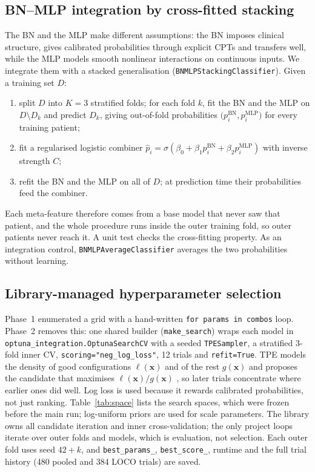 \documentclass[conference]{IEEEtran}
\newcommand{\code}[1]{\texttt{\small #1}}
\begin{document}
\subsection{BN--MLP integration by cross-fitted stacking}
The BN and the MLP make different assumptions: the BN imposes clinical structure, gives calibrated probabilities through explicit CPTs and transfers well, while the MLP models smooth nonlinear interactions on continuous inputs. We integrate them with a stacked generalisation \cite{wolpert,superlearner} (\code{BNMLPStackingClassifier}). Given a training set $D$:
\begin{enumerate}
\item split $D$ into $K=3$ stratified folds; for each fold $k$, fit the BN and the MLP on $D\setminus D_k$ and predict $D_k$, giving out-of-fold probabilities $\big(p^{\text{BN}}_i, p^{\text{MLP}}_i\big)$ for every training patient;
\item fit a regularised logistic combiner $\hat p_i = \sigma(\beta_0 + \beta_1 p^{\text{BN}}_i + \beta_2 p^{\text{MLP}}_i)$ with inverse strength $C$;
\item refit the BN and the MLP on all of $D$; at prediction time their probabilities feed the combiner.
\end{enumerate}
Each meta-feature therefore comes from a base model that never saw that patient, and the whole procedure runs inside the outer training fold, so outer patients never reach it. A unit test checks the cross-fitting property. As an integration control, \code{BNMLPAverageClassifier} averages the two probabilities without learning.

\subsection{Library-managed hyperparameter selection}
Phase~1 enumerated a grid with a hand-written \code{for params in combos} loop. Phase~2 removes this: one shared builder (\code{make\_search}) wraps each model in \code{optuna\_integration.OptunaSearchCV} with a seeded \code{TPESampler}, a stratified 3-fold inner CV, \code{scoring="neg\_log\_loss"}, 12 trials and \code{refit=True}. TPE models the density of good configurations $\ell(\mathbf{x})$ and of the rest $g(\mathbf{x})$ and proposes the candidate that maximises $\ell(\mathbf{x})/g(\mathbf{x})$ \cite{bergstra}, so later trials concentrate where earlier ones did well. Log loss is used because it rewards calibrated probabilities, not just ranking. Table~\ref{tab:space} lists the search spaces, which were frozen before the main run; log-uniform priors are used for scale parameters. The library owns all candidate iteration and inner cross-validation; the only project loops iterate over outer folds and models, which is evaluation, not selection. Each outer fold uses seed $42+k$, and \code{best\_params\_}, \code{best\_score\_}, runtime and the full trial history (480 pooled and 384 LOCO trials) are saved.
\end{document}
